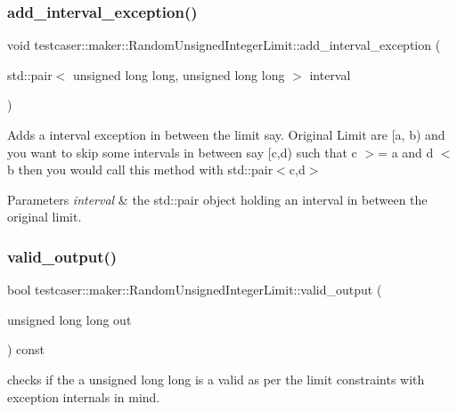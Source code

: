 \subsubsection{\texorpdfstring{add\+\_\+interval\+\_\+exception()}{add\_interval\_exception()}}
{\footnotesize\ttfamily void testcaser\+::maker\+::\+Random\+Unsigned\+Integer\+Limit\+::add\+\_\+interval\+\_\+exception (\begin{DoxyParamCaption}\item[{std\+::pair$<$ unsigned long long, unsigned long long $>$}]{interval }\end{DoxyParamCaption})\hspace{0.3cm}{\ttfamily [inline]}}



Adds a interval exception in between the limit say. Original Limit are \mbox{[}a, b) and you want to skip some intervals in between say \mbox{[}c,d) such that c $>$= a and d $<$ b then you would call this method with std\+::pair$<$c,d$>$ 


\begin{DoxyParams}{Parameters}
{\em interval} & the std\+::pair object holding an interval in between the original limit. \\
\hline
\end{DoxyParams}
\mbox{\label{classtestcaser_1_1maker_1_1RandomUnsignedIntegerLimit_af38fd933b010cd1877e012ed40b2cafa}} 
\subsubsection{\texorpdfstring{valid\+\_\+output()}{valid\_output()}}
{\footnotesize\ttfamily bool testcaser\+::maker\+::\+Random\+Unsigned\+Integer\+Limit\+::valid\+\_\+output (\begin{DoxyParamCaption}\item[{unsigned long long}]{out }\end{DoxyParamCaption}) const\hspace{0.3cm}{\ttfamily [inline]}}



checks if the a unsigned long long is a valid as per the limit constraints with exception internals in mind. 


